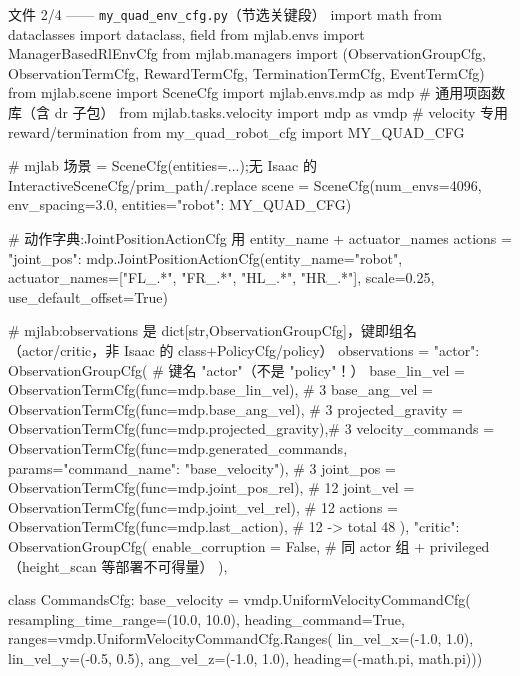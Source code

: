 \begin{codebox}[Python]{文件 2/4 —— \texttt{my\_quad\_env\_cfg.\allowbreak py}（节选关键段）}
import math
from dataclasses import dataclass, field
from mjlab.envs import ManagerBasedRlEnvCfg
from mjlab.managers import (ObservationGroupCfg, ObservationTermCfg, RewardTermCfg,
                            TerminationTermCfg, EventTermCfg)
from mjlab.scene import SceneCfg
import mjlab.envs.mdp as mdp                 # 通用项函数库（含 dr 子包）
from mjlab.tasks.velocity import mdp as vmdp # velocity 专用 reward/termination
from my_quad_robot_cfg import MY_QUAD_CFG

# mjlab 场景 = SceneCfg(entities={...});无 Isaac 的 InteractiveSceneCfg/prim_path/.replace
scene = SceneCfg(num_envs=4096, env_spacing=3.0, entities={"robot": MY_QUAD_CFG})

# 动作字典:JointPositionActionCfg 用 entity_name + actuator_names
actions = {"joint_pos": mdp.JointPositionActionCfg(entity_name="robot",
    actuator_names=["FL_.*", "FR_.*", "HL_.*", "HR_.*"],
    scale=0.25, use_default_offset=True)}

# mjlab:observations 是 dict[str,ObservationGroupCfg]，键即组名（actor/critic，非 Isaac 的 class+PolicyCfg/policy）
observations = {
    "actor": ObservationGroupCfg(                                          # 键名 "actor"（不是 "policy"！）
        base_lin_vel = ObservationTermCfg(func=mdp.base_lin_vel),          # 3
        base_ang_vel = ObservationTermCfg(func=mdp.base_ang_vel),          # 3
        projected_gravity = ObservationTermCfg(func=mdp.projected_gravity),# 3
        velocity_commands = ObservationTermCfg(func=mdp.generated_commands,
            params={"command_name": "base_velocity"}),       # 3
        joint_pos = ObservationTermCfg(func=mdp.joint_pos_rel),            # 12
        joint_vel = ObservationTermCfg(func=mdp.joint_vel_rel),            # 12
        actions   = ObservationTermCfg(func=mdp.last_action),              # 12  -> total 48
    ),
    "critic": ObservationGroupCfg(
        enable_corruption = False,
        # 同 actor 组 + privileged（height_scan 等部署不可得量）
    ),
}

class CommandsCfg:
    base_velocity = vmdp.UniformVelocityCommandCfg(
        resampling_time_range=(10.0, 10.0), heading_command=True,
        ranges=vmdp.UniformVelocityCommandCfg.Ranges(
            lin_vel_x=(-1.0, 1.0), lin_vel_y=(-0.5, 0.5),
            ang_vel_z=(-1.0, 1.0), heading=(-math.pi, math.pi)))


\end{codebox}
